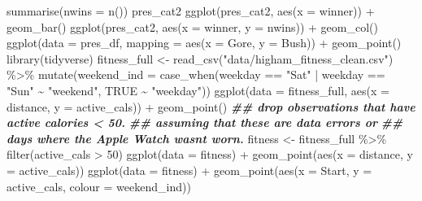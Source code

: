 \documentclass[
]{book}
\newenvironment{Shaded}{\begin{snugshade}}{\end{snugshade}}
\newcommand{\AttributeTok}[1]{\textcolor[rgb]{0.77,0.63,0.00}{#1}}
\newcommand{\ConstantTok}[1]{\textcolor[rgb]{0.00,0.00,0.00}{#1}}
\newcommand{\DecValTok}[1]{\textcolor[rgb]{0.00,0.00,0.81}{#1}}
\newcommand{\DocumentationTok}[1]{\textcolor[rgb]{0.56,0.35,0.01}{\textbf{\textit{#1}}}}
\newcommand{\FunctionTok}[1]{\textcolor[rgb]{0.00,0.00,0.00}{#1}}
\newcommand{\NormalTok}[1]{#1}
\newcommand{\OtherTok}[1]{\textcolor[rgb]{0.56,0.35,0.01}{#1}}
\newcommand{\SpecialCharTok}[1]{\textcolor[rgb]{0.00,0.00,0.00}{#1}}
\newcommand{\StringTok}[1]{\textcolor[rgb]{0.31,0.60,0.02}{#1}}
\begin{document}
\begin{Shaded}
\begin{Highlighting}[]
  \FunctionTok{summarise}\NormalTok{(}\AttributeTok{nwins =} \FunctionTok{n}\NormalTok{())}
\NormalTok{pres\_cat2}
\FunctionTok{ggplot}\NormalTok{(pres\_cat2, }\FunctionTok{aes}\NormalTok{(}\AttributeTok{x =}\NormalTok{ winner)) }\SpecialCharTok{+}
  \FunctionTok{geom\_bar}\NormalTok{()}
\FunctionTok{ggplot}\NormalTok{(pres\_cat2, }\FunctionTok{aes}\NormalTok{(}\AttributeTok{x =}\NormalTok{ winner, }\AttributeTok{y =}\NormalTok{ nwins)) }\SpecialCharTok{+}
  \FunctionTok{geom\_col}\NormalTok{()}
\FunctionTok{ggplot}\NormalTok{(}\AttributeTok{data =}\NormalTok{ pres\_df, }\AttributeTok{mapping =} \FunctionTok{aes}\NormalTok{(}\AttributeTok{x =}\NormalTok{ Gore, }\AttributeTok{y =}\NormalTok{ Bush)) }\SpecialCharTok{+}
  \FunctionTok{geom\_point}\NormalTok{()}
\FunctionTok{library}\NormalTok{(tidyverse)}
\NormalTok{fitness\_full }\OtherTok{\textless{}{-}} \FunctionTok{read\_csv}\NormalTok{(}\StringTok{"data/higham\_fitness\_clean.csv"}\NormalTok{) }\SpecialCharTok{\%\textgreater{}\%} \FunctionTok{mutate}\NormalTok{(}\AttributeTok{weekend\_ind =} \FunctionTok{case\_when}\NormalTok{(weekday }\SpecialCharTok{==} \StringTok{"Sat"} \SpecialCharTok{|}\NormalTok{ weekday }\SpecialCharTok{==} \StringTok{"Sun"} \SpecialCharTok{\textasciitilde{}} \StringTok{"weekend"}\NormalTok{,}
  \ConstantTok{TRUE} \SpecialCharTok{\textasciitilde{}} \StringTok{"weekday"}\NormalTok{))}
\FunctionTok{ggplot}\NormalTok{(}\AttributeTok{data =}\NormalTok{ fitness\_full, }\FunctionTok{aes}\NormalTok{(}\AttributeTok{x =}\NormalTok{ distance, }\AttributeTok{y =}\NormalTok{ active\_cals)) }\SpecialCharTok{+}
  \FunctionTok{geom\_point}\NormalTok{()}
\DocumentationTok{\#\# drop observations that have active calories \textless{} 50. }
\DocumentationTok{\#\# assuming that these are data errors or }
\DocumentationTok{\#\# days where the Apple Watch wasn\textquotesingle{}t worn.}
\NormalTok{fitness }\OtherTok{\textless{}{-}}\NormalTok{ fitness\_full }\SpecialCharTok{\%\textgreater{}\%}
  \FunctionTok{filter}\NormalTok{(active\_cals }\SpecialCharTok{\textgreater{}} \DecValTok{50}\NormalTok{)}
\FunctionTok{ggplot}\NormalTok{(}\AttributeTok{data =}\NormalTok{ fitness) }\SpecialCharTok{+}
  \FunctionTok{geom\_point}\NormalTok{(}\FunctionTok{aes}\NormalTok{(}\AttributeTok{x =}\NormalTok{ distance, }\AttributeTok{y =}\NormalTok{ active\_cals))}
\FunctionTok{ggplot}\NormalTok{(}\AttributeTok{data =}\NormalTok{ fitness) }\SpecialCharTok{+}
  \FunctionTok{geom\_point}\NormalTok{(}\FunctionTok{aes}\NormalTok{(}\AttributeTok{x =}\NormalTok{ Start, }\AttributeTok{y =}\NormalTok{ active\_cals, }\AttributeTok{colour =}\NormalTok{ weekend\_ind))}

\end{Highlighting}
\end{Shaded}
\end{document}
